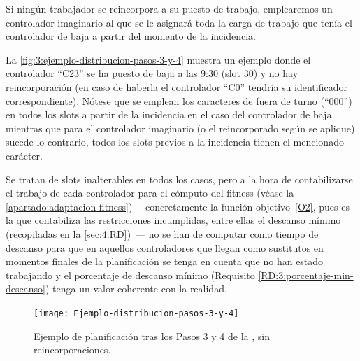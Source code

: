 Si ningún trabajador se reincorpora a su puesto de trabajo, emplearemos un controlador imaginario al que se le asignará toda la carga de trabajo que tenía el controlador de baja a partir del momento de la incidencia.

La \autoref{fig:3:ejemplo-distribucion-pasos-3-y-4} muestra un ejemplo donde el controlador ``C23'' se ha puesto de baja a las 9:30 (slot 30) y no hay reincorporación (en caso de haberla el controlador ``C0'' tendría su identificador correspondiente). Nótese que se emplean los caracteres de fuera de turno (``000'') en todos los slots a partir de la incidencia en el caso del controlador de baja mientras que para el controlador imaginario (o el reincorporado según se aplique) sucede lo contrario, todos los slots previos a la incidencia tienen el mencionado carácter. 

Se tratan de slots inalterables en todos los casos, pero a la hora de contabilizarse el trabajo de cada controlador para el cómputo del fitness (véase la \autoref{apartado:adaptacion-fitness}) ---concretamente la función objetivo~\ref{O2}, pues es la que contabiliza las restricciones incumplidas, entre ellas el descanso mínimo (recopiladas en la \autoref{sec:4:RD})~--- no se han de computar como tiempo de descanso para que en aquellos controladores que llegan como sustitutos en momentos finales de la planificación se tenga en cuenta que no han estado trabajando y el porcentaje de descanso mínimo (Requisito \ref{RD:3:porcentaje-min-descanso}) tenga un valor coherente con la realidad.

\begin{figure}[htbp]
	\centering
	\texttt{[image: Ejemplo-distribucion-pasos-3-y-4]}
	\caption[Ejemplo de planificación tras los pasos 3 y 4 de la \faseuno{}]{Ejemplo de planificación tras los Pasos 3 y 4 de la \faseuno{}, sin reincorporaciones.}
	\label{fig:3:ejemplo-distribucion-pasos-3-y-4}
\end{figure}
%
%
%